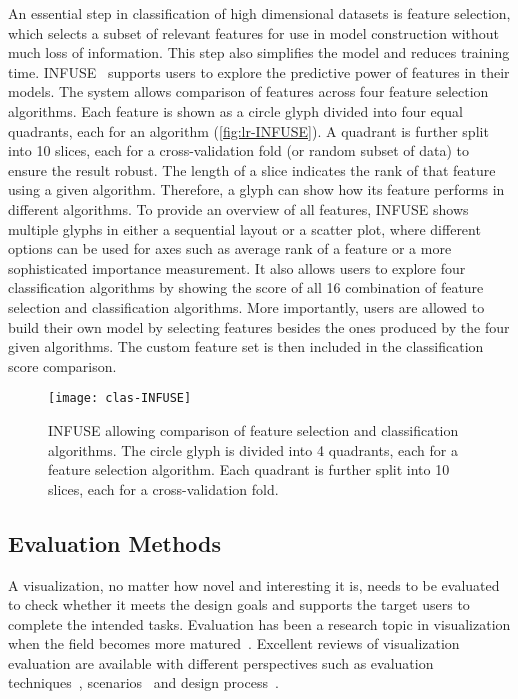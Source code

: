 An essential step in classification of high dimensional datasets is feature selection, which selects a subset of relevant features for use in model construction without much loss of information. This step also simplifies the model and reduces training time. INFUSE~\cite{Krause2014} supports users to explore the predictive power of features in their models. The system allows comparison of features across four feature selection algorithms. Each feature is shown as a circle glyph divided into four equal quadrants, each for an algorithm (\autoref{fig:lr-INFUSE}). A quadrant is further split into 10 slices, each for a cross-validation fold (or random subset of data) to ensure the result  robust. The length of a slice indicates the rank of that feature using a given algorithm. Therefore, a glyph can show how its feature performs in different algorithms. To provide an overview of all features, INFUSE shows multiple glyphs in either a sequential layout or a scatter plot, where different options can be used for axes such as average rank of a feature or a more sophisticated importance measurement. It also allows users to explore four classification algorithms by showing the score of all 16 combination of feature selection and classification algorithms. More importantly, users are allowed to build their own model by selecting features besides the ones produced by the four given algorithms. The custom feature set is then included in the classification score comparison.

\begin{figure}[!htb]
	\centering
	\texttt{[image: clas-INFUSE]}
	\caption{INFUSE allowing comparison of feature selection and classification algorithms. The circle glyph is divided into 4 quadrants, each for a feature selection algorithm. Each quadrant is further split into 10 slices, each for a cross-validation fold. }
	\label{fig:lr-INFUSE}
\end{figure}

\subsection{Evaluation Methods}
\label{sub:lr-evaluation}
A visualization, no matter how novel and interesting it is, needs to be evaluated to check whether it meets the design goals and supports the target users to complete the intended tasks. Evaluation has been a research topic in visualization when the field becomes more matured~\cite{Plaisant2004}. Excellent reviews of visualization evaluation are available with different perspectives such as evaluation techniques~\cite{Carpendale2008}, scenarios~\cite{Lam2012} and design process~\cite{Munroe2009}.


